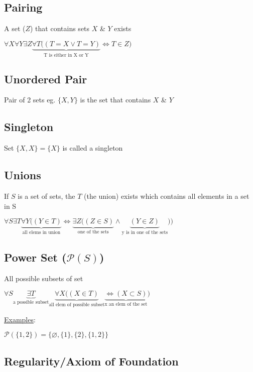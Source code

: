 \documentclass[12pt]{article}
\begin{document}
\begin{spacing}{1.5}
\subsection{Pairing}

A set ($Z$) that contains sets $X$ \& $Y$ exists

$\forall X \forall Y \exists Z \underbrace{\forall T ((T = X \vee T = Y)}_{\textrm{T is either in X or Y}} \Leftrightarrow T \in Z)$

\subsection{Unordered Pair}

Pair of 2 sets eg. $\{ X, Y \}$ is the set that contains $X$ \& $Y$

\subsection{Singleton}

Set $\{X, X\} = \{X\}$ is called a singleton

\subsection{Unions}

If $S$ is a set of sets, the $T$ (the union) exists which contains all elements in a set in S

$\forall S \exists T 
\underbrace{\forall Y ((Y \in T)}_{\textrm{all elems in union}} 
\Leftrightarrow 
\underbrace{\exists Z((Z \in S)}_{\textrm{one of the sets}} \wedge 
\underbrace{(Y \in Z)}_{\textrm{y is in one of the sets}}))$

\subsection{Power Set ($\mathcal{P}(S)$)}

All possible subsets of set

$\forall S \underbrace{\exists T}_{\text{a possible subset}} \underbrace{\forall X ((X \in T)}_{\text{all elem of possible subset}} 
\underbrace{\Leftrightarrow (X \subset S)}_{\text{x an elem of the set}})$

\underline{Examples}: 

$\mathcal{P}(\{1,2\}) = \{ \varnothing, \{1\}, \{2\}, \{1,2\} \}$

\subsection{Regularity/Axiom of Foundation}


\end{spacing}
\end{document}
